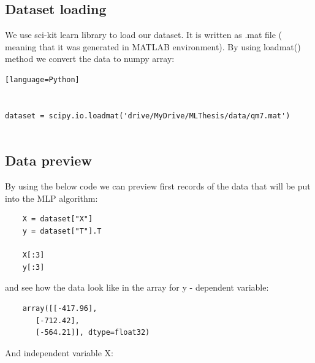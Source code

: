 \documentclass[a4paper,oneside,openright,11pt]{book}
\begin{document}
\subsection{Dataset loading}

We use sci-kit learn library to load our dataset. It is written as .mat file ( meaning that it was generated in MATLAB environment). By using loadmat() method we convert the data to numpy array:

\begin{verbatim}[language=Python]


dataset = scipy.io.loadmat('drive/MyDrive/MLThesis/data/qm7.mat')


\end{verbatim}


\subsection{Data preview}

By using the below code we can preview first records of the data that will be put into the MLP algorithm:

\begin{verbatim}
    X = dataset["X"]
    y = dataset["T"].T

    X[:3]
    y[:3]
\end{verbatim}

and see how the data look like in the array for y - dependent variable:

\begin{verbatim}
    array([[-417.96],
       [-712.42],
       [-564.21]], dtype=float32)
\end{verbatim}

And independent variable X:
\end{document}
